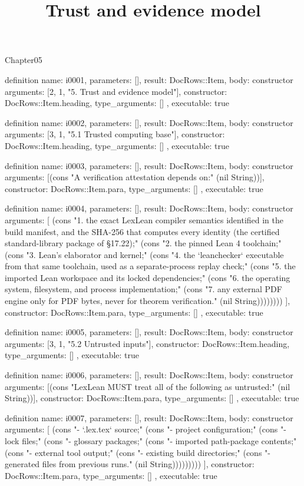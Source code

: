 \begin{lexlean}{Chapter05}
\title{Trust and evidence model}
\begin{semanticmodule}
definition{
  name: i0001,
  parameters: [],
  result: DocRows::Item,
  body: constructor{
    arguments: [2, 1, "5. Trust and evidence model"],
    constructor: DocRows::Item.heading,
    type_arguments: []
  },
  executable: true
}

definition{
  name: i0002,
  parameters: [],
  result: DocRows::Item,
  body: constructor{
    arguments: [3, 1, "5.1 Trusted computing base"],
    constructor: DocRows::Item.heading,
    type_arguments: []
  },
  executable: true
}

definition{
  name: i0003,
  parameters: [],
  result: DocRows::Item,
  body: constructor{
    arguments: [(cons "A verification attestation depends on:" (nil String))],
    constructor: DocRows::Item.para,
    type_arguments: []
  },
  executable: true
}

definition{
  name: i0004,
  parameters: [],
  result: DocRows::Item,
  body: constructor{
    arguments: [
      (cons "1. the exact LexLean compiler semantics identified in the build manifest, and the SHA-256 that computes every identity (the certified standard-library package of §17.22);" (cons "2. the pinned Lean 4 toolchain;" (cons "3. Lean's elaborator and kernel;" (cons "4. the `leanchecker` executable from that same toolchain, used as a separate-process replay check;" (cons "5. the imported Lean workspace and its locked dependencies;" (cons "6. the operating system, filesystem, and process implementation;" (cons "7. any external PDF engine only for PDF bytes, never for theorem verification." (nil String))))))))
    ],
    constructor: DocRows::Item.para,
    type_arguments: []
  },
  executable: true
}

definition{
  name: i0005,
  parameters: [],
  result: DocRows::Item,
  body: constructor{
    arguments: [3, 1, "5.2 Untrusted inputs"],
    constructor: DocRows::Item.heading,
    type_arguments: []
  },
  executable: true
}

definition{
  name: i0006,
  parameters: [],
  result: DocRows::Item,
  body: constructor{
    arguments: [(cons "LexLean MUST treat all of the following as untrusted:" (nil String))],
    constructor: DocRows::Item.para,
    type_arguments: []
  },
  executable: true
}

definition{
  name: i0007,
  parameters: [],
  result: DocRows::Item,
  body: constructor{
    arguments: [
      (cons "- `.lex.tex` source;" (cons "- project configuration;" (cons "- lock files;" (cons "- glossary packages;" (cons "- imported path-package contents;" (cons "- external tool output;" (cons "- existing build directories;" (cons "- generated files from previous runs." (nil String)))))))))
    ],
    constructor: DocRows::Item.para,
    type_arguments: []
  },
  executable: true
}


\end{semanticmodule}
\end{lexlean}
